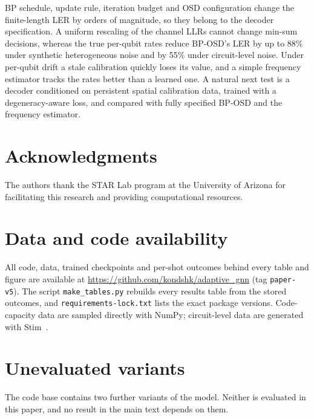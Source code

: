 \documentclass[a4paper,twocolumn,11pt,nopdfoutputerror]{quantumarticle}
\begin{document}
BP schedule, update rule, iteration budget and OSD configuration change
the finite-length LER by orders of magnitude, so they belong to the
decoder specification. A uniform rescaling of the channel LLRs cannot
change min-sum decisions, whereas the true per-qubit rates reduce
BP-OSD's LER by up to 88\% under synthetic heterogeneous noise and by 55\%
under circuit-level noise. Under per-qubit drift a stale calibration quickly loses its
value, and a simple frequency estimator tracks the rates better than a
learned one. A natural next test is a
decoder conditioned on persistent spatial calibration data, trained with a
degeneracy-aware loss, and compared with fully specified BP-OSD and the
frequency estimator.
\section*{Acknowledgments}

The authors thank the STAR Lab program at the University of Arizona
for facilitating this research and providing computational resources.

\section*{Data and code availability}

{\raggedright All code, data, trained checkpoints and per-shot outcomes
behind every table and figure are available at
\url{https://github.com/kondshk/adaptive_gnn} (tag \texttt{paper-v5}).
The script \texttt{make\_tables.py} rebuilds every results table from the
stored outcomes, and \texttt{requirements-lock.txt} lists the exact
package versions. Code-capacity data are sampled directly with NumPy;
circuit-level data are generated with Stim~\cite{Gidney2021Stim}.\par}




\appendix

\section{Unevaluated variants}\label{app:variants}

The code base contains two further variants of the model. Neither is
evaluated in this paper, and no result in the main text depends on them.
\end{document}
